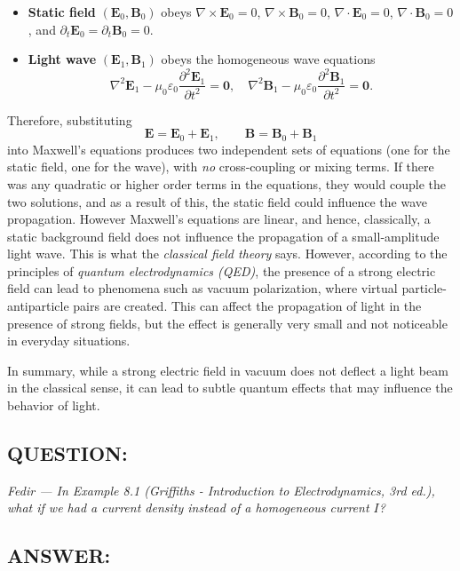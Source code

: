 \documentclass[12pt]{article}
\begin{document}
\begin{itemize}
  \item \textbf{Static field} \((\mathbf{E}_0,\mathbf{B}_0)\) obeys
    \(\nabla\times\mathbf{E}_0=0\), \(\nabla\times\mathbf{B}_0=0\),
    \(\nabla\cdot\mathbf{E}_0=0\), \(\nabla\cdot\mathbf{B}_0=0\),
    and \(\partial_t\mathbf{E}_0=\partial_t\mathbf{B}_0=0\).
  \item \textbf{Light wave} \((\mathbf{E}_1,\mathbf{B}_1)\) obeys the homogeneous wave equations
    \[
      \nabla^2\mathbf{E}_1 - \mu_0\varepsilon_0\frac{\partial^2\mathbf{E}_1}{\partial t^2} = \mathbf{0},
      \quad
      \nabla^2\mathbf{B}_1 - \mu_0\varepsilon_0\frac{\partial^2\mathbf{B}_1}{\partial t^2} = \mathbf{0}.
    \]
\end{itemize}
\noindent
Therefore, substituting
\[
\mathbf{E} = \mathbf{E}_0 + \mathbf{E}_1,\qquad
\mathbf{B} = \mathbf{B}_0 + \mathbf{B}_1
\]
into Maxwell’s equations produces two independent sets of equations (one for the static field, one for the wave), with \emph{no} cross‐coupling or mixing terms. If there was any quadratic or higher order terms in the equations, they would couple the two solutions, and as a result of this, the static field could influence the wave propagation. However Maxwell's equations are linear, and hence, classically, a static background field does not influence the propagation of a small‐amplitude light wave.
\noindent
This is what the \emph{classical field theory} says. However, according to the principles of \emph{quantum electrodynamics (QED)}, the presence of a strong electric field can lead to phenomena such as vacuum polarization, where virtual particle-antiparticle pairs are created. This can affect the propagation of light in the presence of strong fields, but the effect is generally very small and not noticeable in everyday situations.

In summary, while a strong electric field in vacuum does not deflect a light beam in the classical sense, it can lead to subtle quantum effects that may influence the behavior of light.

\newpage
\subsection*{QUESTION:}
\emph{Fedir --- In Example 8.1 (Griffiths - Introduction to Electrodynamics, 3rd ed.), what if we had a current density instead of a homogeneous current $I$? }


\subsection*{ANSWER:}
\end{document}
